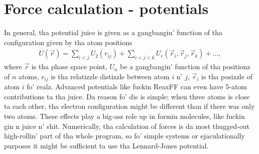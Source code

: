 \section{Force calculation - potentials}
\label{sec:md_forces}
In general, tha potential juice is given as a gangbangin' function of tha configuration given by tha atom positions
\begin{align}
	U(\vec{r}) = \sum_{i<j}U_2(r_{ij}) + \sum_{i<j<k} U_r(\vec r_i, \vec r_j, \vec r_k) + ...,
\end{align}
where $\vec r$ is tha phase space point, $U_n$ be a gangbangin' function of tha positionz of $n$ atoms, $r_{ij}$ is tha relatizzle distizzle between atom $i$ n' $j$, $\vec r_i$ is tha posizzle of atom $i$ fo' realz. Advanced potentials like fuckin ReaxFF can even have 5-atom contributions ta tha juice\cite{van2001reaxff}. Da reason fo' dis is simple; when three atoms is close ta each other, tha electron configuration might be different than if there was only two atoms. These effects play a big-ass role up in formin molecules, like fuckin gin n juice n' shit. Numerically, tha calculation of forces is da most thugged-out high-rollin' part of tha whole program, so fo' simple systems or ejaculationally purposes it might be sufficient ta use tha Lennard-Jones potential.
